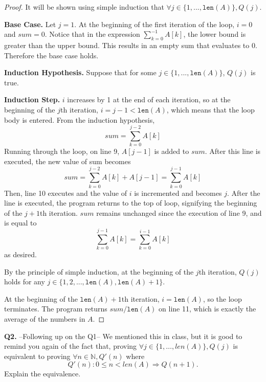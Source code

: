\documentclass[11pt]{article}
\begin{document}
    \begin{proof}
        It will be shown using simple induction that \(\forall j \in \{1,..., \texttt{len}(A) \},Q(j)\).

        \textbf{Base Case.} Let \(j = 1\). At the beginning of the first iteration of the loop, \(i=0\) and \(sum=0\). Notice that in the expression \(\sum_{k=0} ^{-1} A[k]\), the lower bound is greater than the upper bound. This results in an empty sum that evaluates to \(0\). Therefore the base case holds.

        \textbf{Induction Hypothesis.} Suppose that for some \(j \in \{1,..., \texttt{len}(A)\}\), \(Q(j)\) is true.

        \textbf{Induction Step.} \(i\) increases by 1 at the end of each iteration, so at the beginning of the \(j\)th iteration, \(i = j-1<\texttt{len}(A)\), which means that the loop body is entered. From the induction hypothesis,
        \[
            sum = \sum_{k=0}^{j-2} A[k]
        \]
        Running through the loop, on line 9, \(A[j-1]\) is added to \(sum\). After this line is executed, the new value of sum becomes
        \[
            sum = \sum_{k=0} ^{j-2} A[k] + A[j-1] = \sum_{k=0} ^{j-1} A[k]
        \]
        Then, line 10 executes and the value of \(i\) is incremented and becomes \(j\). After the line is executed, the program returns to the top of loop, signifying the beginning of the \(j+1\)th iteration. \(sum\) remains unchanged since the execution of line 9, and is equal to
        \[
            \sum_{k=0}^{j-1} A[k] = \sum_{k=0}^{i-1} A[k]
        \]
        as desired.

        By the principle of simple induction, at the beginning of the \(j\)th iteration, \(Q(j)\) holds for any \(j \in \{1,2,..., \texttt{len}(A), \texttt{len}(A) +1\}\).

        At the beginning of the \(\texttt{len}(A) +1\)th iteration, \(i = \texttt{len}(A)\), so the loop terminates. The program returns \(sum / \texttt{len}(A)\) on line 11, which is exactly the average of the numbers in \(A\).

    \end{proof}
    \pagebreak
    \textbf{Q2.} --Following up on the Q1-- We mentioned this in class, but it is good to remind you again of the fact that, proving $\forall j\in\{1,\ldots,len(A)\}, Q(j)$ is equivalent to proving $\forall n\in\mathbb{N}, Q'(n)$ where $$Q'(n): 0\leq n<len(A) \Rightarrow Q(n+1).$$ Explain the equivalence.
\end{document}
